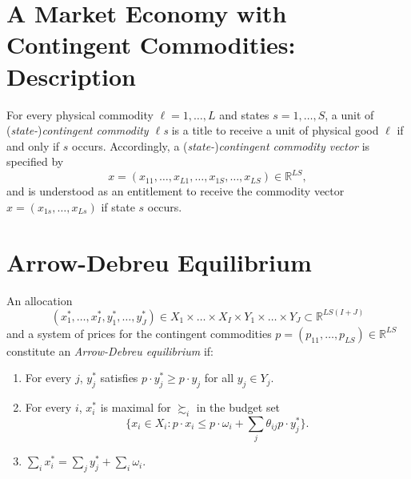 \addtocounter{section}{1}

\section{A Market Economy with Contingent Commodities: Description}

\begin{defn}
    For every physical commodity $\ell = 1, \dots, L$ and states $s = 1, \dots, S$, a unit of (\emph{state-})\emph{contingent commodity $\ell$s} is a title to receive a unit of physical good $\ell$ if and only if $s$ occurs. Accordingly, a (\emph{state-})\emph{contingent commodity vector} is specified by
    \begin{equation*}
        x = (x_{11}, \dots, x_{L1}, \dots, x_{1S}, \dots, x_{LS}) \in \mathbb{R}^{LS},
    \end{equation*}
    and is understood as an entitlement to receive the commodity vector $x = (x_{1s}, \dots, x_{Ls})$ if state $s$ occurs.
\end{defn}


\section{Arrow-Debreu Equilibrium}

\begin{defn}
    An allocation
    \begin{equation*}
        (x^*_1, \dots, x^*_I, y^*_1, \dots, y^*_J) \in X_1 \times \dots \times X_I \times Y_1 \times \dots \times Y_J \subset \mathbb{R}^{LS(I + J)}
    \end{equation*}
    and a system of prices for the contingent commodities $p = (p_{11}, \dots, p_{LS}) \in \mathbb{R}^{LS}$ constitute an \emph{Arrow-Debreu equilibrium} if:
    \begin{enumerate}
        \item For every $j$, $y^*_j$ satisfies $p \cdot y^*_j \geq p \cdot y_j$ for all $y_j \in Y_j$.
        \item 
        For every $i$, $x^*_i$ is maximal for $\succsim_i$ in the budget set
        \begin{equation*}
            \{x_i \in X_i: p \cdot x_i \leq p \cdot \omega_i + \sum_j \theta_{ij} p \cdot y^*_j\}.
        \end{equation*}
        \item $\sum_i x^*_i = \sum_j y^*_j + \sum_i \omega_i$.
    \end{enumerate}
\end{defn}


